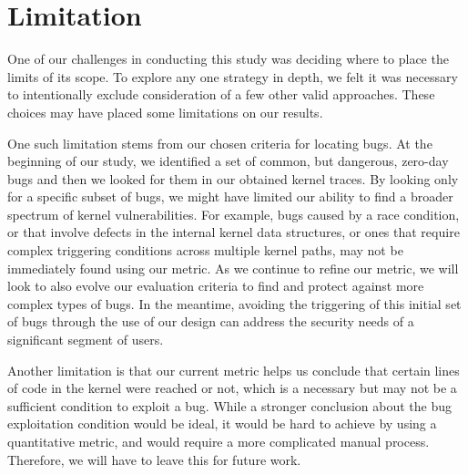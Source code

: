 \section{Limitation} 
\label{sec.limitation}

One of our challenges in conducting this study was deciding where to place the
limits of its scope.  To explore any one strategy
in depth, we felt it was necessary to intentionally exclude consideration of
a few other valid approaches. These choices may have placed some limitations on our results.

One such limitation stems from our chosen criteria for locating
bugs. At the beginning
of our study, we identified a set of common, but dangerous, zero-day bugs
and then we looked for them in our obtained kernel traces. By looking only
for a specific subset of bugs, we might have limited our
ability to find a broader spectrum of kernel vulnerabilities. For example, bugs
caused by a race condition, or that involve defects in the internal kernel data
structures, or ones that require complex triggering conditions across multiple kernel
paths, may not be immediately found using our metric. As we continue to refine
our metric, we will look to also evolve our evaluation
criteria to find and protect against more complex types of bugs. 
In the meantime, avoiding the triggering of this initial set of bugs
through the use of our \lip design can address the security
needs of a significant segment of users. 

Another limitation is that our current metric helps us conclude that certain lines of code in 
the kernel were reached or not, which is a necessary but may not be a sufficient condition 
to exploit a bug. While a stronger conclusion about the bug exploitation condition would be ideal, 
it would be hard to achieve by using a quantitative metric, and would require a more complicated manual process. 
Therefore, we will have to leave this for future work.  


